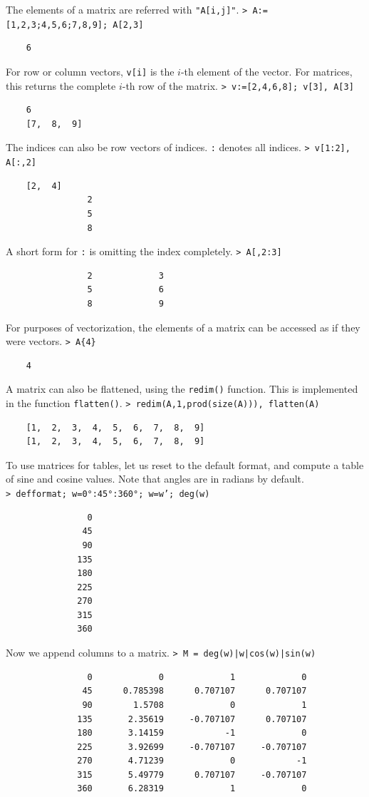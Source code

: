 \documentclass[11pt, a4paper]{article}
\newcommand{\emtcmd}[1]{\noindent\texttt{\textcolor{emtcommand}{>}\ #1}\par\smallskip}
\begin{document}
The elements of a matrix are referred with \texttt{"A[i,j]"}.
\emtcmd{A:=[1,2,3;4,5,6;7,8,9]; A[2,3]}
\begin{verbatim}
    6
\end{verbatim}

For row or column vectors, \texttt{v[i]} is the $i$-th element of the vector. For matrices, this returns the complete $i$-th row of the matrix.
\emtcmd{v:=[2,4,6,8]; v[3], A[3]}
\begin{verbatim}
    6
    [7,  8,  9]
\end{verbatim}

The indices can also be row vectors of indices. \texttt{:} denotes all indices.
\emtcmd{v[1:2], A[:,2]}
\begin{verbatim}
    [2,  4]
                2
                5
                8
\end{verbatim}

A short form for \texttt{:} is omitting the index completely.
\emtcmd{A[,2:3]}
\begin{verbatim}
                2             3
                5             6
                8             9
\end{verbatim}

For purposes of vectorization, the elements of a matrix can be accessed as if they were vectors.
\emtcmd{A\{4\}}
\begin{verbatim}
    4
\end{verbatim}

A matrix can also be flattened, using the \texttt{redim()} function. This is implemented in the function \texttt{flatten()}.
\emtcmd{redim(A,1,prod(size(A))), flatten(A)}
\begin{verbatim}
    [1,  2,  3,  4,  5,  6,  7,  8,  9]
    [1,  2,  3,  4,  5,  6,  7,  8,  9]
\end{verbatim}

To use matrices for tables, let us reset to the default format, and compute a table of sine and cosine values. Note that angles are in radians by default.
\emtcmd{defformat; w=0°:45°:360°; w=w'; deg(w)}
\begin{verbatim}
                0
               45
               90
              135
              180
              225
              270
              315
              360
\end{verbatim}

Now we append columns to a matrix.
\emtcmd{M = deg(w)|w|cos(w)|sin(w)}
\begin{verbatim}
                0             0             1             0
               45      0.785398      0.707107      0.707107
               90        1.5708             0             1
              135       2.35619     -0.707107      0.707107
              180       3.14159            -1             0
              225       3.92699     -0.707107     -0.707107
              270       4.71239             0            -1
              315       5.49779      0.707107     -0.707107
              360       6.28319             1             0
\end{verbatim}
\end{document}
